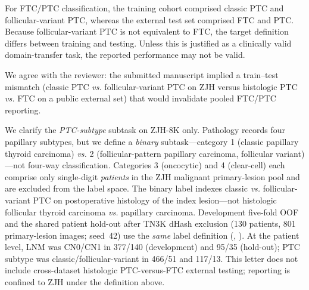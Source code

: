 \label{rev:R2.10}
\begin{reviewercomment}
For FTC/PTC classification, the training cohort comprised classic PTC and follicular-variant PTC, whereas the external test set comprised FTC and PTC. Because follicular-variant PTC is not equivalent to FTC, the target definition differs between training and testing. Unless this is justified as a clinically valid domain-transfer task, the reported performance may not be valid.
\end{reviewercomment}
\begin{authorresponse}
We agree with the reviewer: the submitted manuscript implied a train--test mismatch (classic PTC \emph{vs.} follicular-variant PTC on ZJH versus histologic PTC \emph{vs.} FTC on a public external set) that would invalidate pooled FTC/PTC reporting.\par
We clarify the \emph{PTC-subtype} subtask on ZJH-8K only. Pathology records four papillary subtypes, but we define a \emph{binary} subtask---category 1 (classic papillary thyroid carcinoma) \emph{vs.} 2 (follicular-pattern papillary carcinoma, follicular variant)---not four-way classification. Categories 3 (oncocytic) and 4 (clear-cell) each comprise only single-digit \emph{patients} in the ZJH malignant primary-lesion pool and are excluded from the label space. The binary label indexes classic \emph{vs.} follicular-variant PTC on postoperative histology of the index lesion---not histologic follicular thyroid carcinoma \emph{vs.} papillary carcinoma. Development five-fold OOF and the shared patient hold-out after TN3K dHash exclusion (130 patients, 801 primary-lesion images; seed~42) use the \emph{same} label definition (, ). At the patient level, LNM was CN0/CN1 in 377/140 (development) and 95/35 (hold-out); PTC subtype was classic/follicular-variant in 466/51 and 117/13. This letter does not include cross-dataset histologic PTC-versus-FTC external testing; reporting is confined to ZJH under the definition above.\par
\par
\end{authorresponse}

